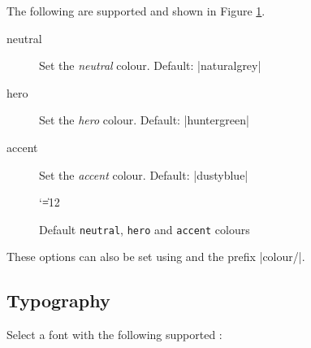 \documentclass[a4paper]{l3doc}
\begin{document}
The following  are supported and shown in Figure
\ref{defaultcolours}.

\begin{description}
  \item[neutral] Set the \emph{neutral} colour. Default: |naturalgrey|
  \item[hero] Set the \emph{hero} colour. Default: |huntergreen|
  \item[accent] Set the \emph{accent} colour. Default: |dustyblue|
\end{description}

\begin{figure}
  \centering
  \catcode`\|=12
  \caption{Default \texttt{neutral}, \texttt{hero} and \texttt{accent}
  colours}\label{defaultcolours}
\end{figure}

These options can also be set using  and the prefix
|colour/|.

\subsection{Typography}

\begin{function}{\AFESBrandFontSelect}
  \begin{syntax}
  \end{syntax}
  Select a font with the following supported :
\end{function}
\end{document}
